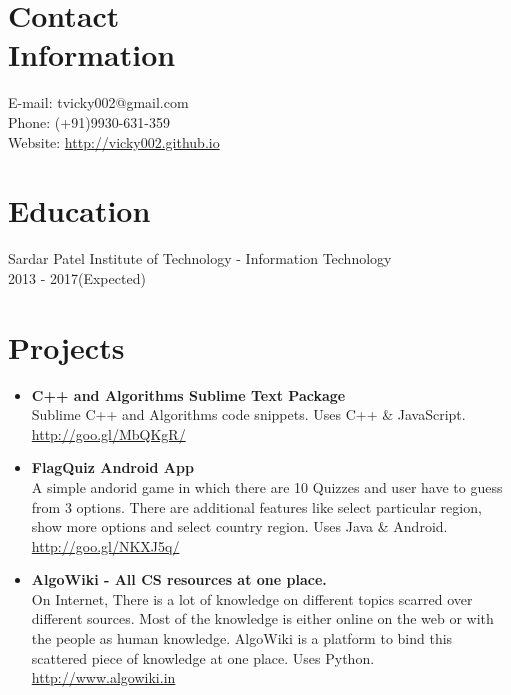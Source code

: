\documentclass[margin,line]{res}
\begin{document}

\begin{resume}

\section{Contact\\Information}  
E-mail: tvicky002@gmail.com\\
Phone: (+91)9930-631-359\\
Website: \url{http://vicky002.github.io}\\



\section{Education}
Sardar Patel Institute of Technology - Information Technology\\
2013 - 2017(Expected)\\

\section{Projects}
\begin{itemize} \itemsep -4pt
\item \textbf{C++ and Algorithms Sublime Text Package }\\
Sublime C++ and Algorithms code snippets. Uses C++ \& JavaScript. \\
\url{http://goo.gl/MbQKgR/}\\

\item \textbf{FlagQuiz Android App}\\
A simple andorid game in which there are 10 Quizzes and user have to guess from 3 options. There are additional features like select particular region, show more options and select country region. Uses Java \& Android.\\
 \url{http://goo.gl/NKXJ5q/}\\

\item \textbf{AlgoWiki - All CS resources at one place.}\\
On Internet, There is a lot of knowledge on different topics scarred over different sources. Most of the knowledge is
either online on the web or with the people as human knowledge. AlgoWiki is a platform to bind this scattered piece of knowledge at one place. Uses Python.\\
\url{http://www.algowiki.in}\\


\end{itemize}
\end{resume}
\end{document}
